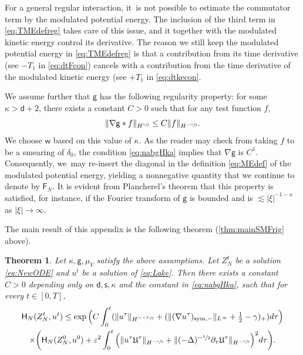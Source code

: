 \documentclass[10pt]{amsart}
\newcommand{\psfrac}[2]{\sfrac{(#1)}{#2}}
\newcommand{\sym}{\textup{sym}}
\theoremstyle{plain}
\newtheorem{thm}{Theorem}[section]
\theoremstyle{definition}
\let\ga\gamma
\let\vep\varepsilon
\let\ka\kappa
\let\nab\nabla
\let\p\partial
\let\uz Z
\newcommand{\Uu}{\mathfrak{U}}
\newcommand{\Fr}{\mathsf{F}}
\newcommand{\Hr}{\mathsf{H}}
\renewcommand{\d}{\mathsf{d}}
\newcommand{\g}{{\mathsf{g}}}
\newcommand{\s}{\mathsf{s}}
\newcommand{\w}{\mathsf{w}}
\begin{document}
{For a general regular interaction, it~is not possible to estimate the commutator term by the modulated potential energy. The inclusion of the third term in \eqref{eq:TMEdefreg} takes care of this issue, and it together with the modulated kinetic energy control its derivative. The reason we still keep the modulated potential energy in \eqref{eq:TMEdefreg} is that a contribution from its time derivative (see $-T_1$ in \eqref{eq:dtFcon}) cancels with a contribution from the time derivative of the modulated kinetic energy (see $+T_1$ in \eqref{eq:dtkecon}.}

We assume further that $\g$ has the following regularity property: {for some $\ka>\d+2$,} there exists a constant $C>0$ such that for any test function $f$,
\begin{equation}\label{eq:nabgHka}
\|\nab\g\ast f\|_{H^{\sfrac{\ka}{2}}} \le C \|f\|_{H^ {-\sfrac{\ka}{2}}}.
\end{equation}
{We choose $\w$ based on this value of $\ka$.} As the reader may check from taking $f$ to be a smearing of $\delta_0$, the condition \eqref{eq:nabgHka} implies that $\nab\g$ is {$C^1$}. Consequently, we~may re-insert the diagonal in the definition \eqref{eq:MEdef} of the modulated potential energy, yielding a nonnegative quantity {that we continue to denote by $\Fr_N$}. It is evident from Plancherel's theorem that this property is satisfied, for instance, if the Fourier transform of $\g$ is bounded and is $\lesssim |\xi|^{-1-\ka}$ as $|\xi|\to\infty$.

The main result of this appendix is the following theorem (\cf \cref{thm:mainSMFrig} above).

\begin{thm}\label{thm:mainSMFrigreg}
Let $\ka,\g,\mu_V$ satisfy the above assumptions. Let $Z_N^t$ be a solution \eqref{eq:NewODE} and $u^t$ be a solution of \eqref{eq:Lake}. Then there {exists a constant $C>0$} depending only on {$\d,\s,\ka$ and the constant in \eqref{eq:nabgHka}}, such that for every $t\in [0,T]$,
\begin{multline}\label{eq:SMFrigreg}
\Hr_{N}(\uz_N^t,u^t) \le \exp\Big(C\int_0^t(\|u^\tau\|_{H^{\psfrac{\ka+2}{2}}} + (\|(\nab u^\tau)_{\sym,-} \|_{L^\infty}+\tfrac12-\ga)_+ ) d\tau\Big)\\
\times\biggl(\Hr_{N}(\uz_N^0,u^0) + \vep^2\int_0^t \Big( \|u^\tau\Uu^\tau\|_{H^ {-\sfrac{\ka}{2}}} + \|(-\Delta)^{-\sfrac{1}{2}}\p_\tau \Uu^\tau\|_{H^ {-\sfrac{\ka}{2}}}\Big)^2 d\tau\biggr).
\end{multline}
\end{thm}
\end{document}
